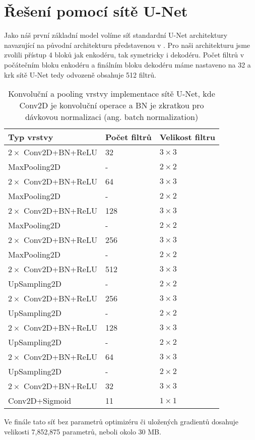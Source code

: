 \section{Řešení pomocí sítě U-Net}
\label{sec:Chapter43}
Jako náš první základní model volíme síť standardní U-Net architektury navazující na původní architekturu představenou v \cite{unet}. Pro naši architekturu jsme zvolili přístup 4 bloků jak enkodéru, tak symetricky i dekodéru. Počet filtrů v počátečním bloku enkodéru a finálním bloku dekodéru máme nastaveno na 32 a krk sítě U-Net tedy odvozeně obsahuje 512 filtrů. 

\begin{table}[ht]
\centering
\begin{tabular}{@{}lll@{}}
\toprule
Typ vrstvy & Počet filtrů & Velikost filtru \\ \midrule
$2\times$ Conv2D+BN+ReLU & 32 & $3 \times 3$ \\
MaxPooling2D & - & $2 \times 2$ \\
$2\times$ Conv2D+BN+ReLU & 64 & $3 \times 3$ \\
MaxPooling2D & - & $2 \times 2$ \\
$2\times$ Conv2D+BN+ReLU & 128 & $3 \times 3$ \\
MaxPooling2D & - & $2 \times 2$ \\
$2\times$ Conv2D+BN+ReLU & 256 & $3 \times 3$ \\
MaxPooling2D & - & $2 \times 2$ \\
$2\times$ Conv2D+BN+ReLU & 512 & $3 \times 3$ \\
UpSampling2D & - & $2 \times 2$ \\
$2\times$ Conv2D+BN+ReLU & 256 & $3 \times 3$ \\
UpSampling2D & - & $2 \times 2$ \\
$2\times$ Conv2D+BN+ReLU & 128 & $3 \times 3$ \\
UpSampling2D & - & $2 \times 2$ \\
$2\times$ Conv2D+BN+ReLU & 64 & $3 \times 3$ \\
UpSampling2D & - & $2 \times 2$ \\
$2\times$ Conv2D+BN+ReLU & 32 & $3 \times 3$ \\
Conv2D+Sigmoid & 11 & $1 \times 1$ \\
\bottomrule
\end{tabular}
\caption[Konvoluční a pooling vrstvy implementace sítě U-Net]{Konvoluční a pooling vrstvy implementace sítě U-Net, kde Conv2D je konvoluční operace a BN je zkratkou pro dávkovou normalizaci (ang. batch normalization) }
\label{fig:model_architecture}
\end{table}

Ve finále tato síť bez parametrů optimizéru či uložených gradientů dosahuje velikosti 7,852,875 parametrů, neboli okolo 30 MB.


\endinput